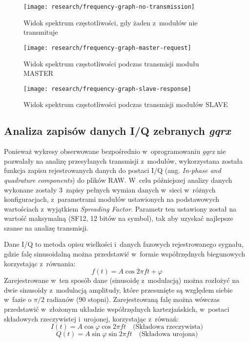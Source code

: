 \begin{figure}[!htbp]
    \centering
    \texttt{[image: research/frequency-graph-no-transmission]}
    \caption{\label{img:frequency-graph-no-transmission}Widok spektrum częstotliwości, gdy żaden z~modułów nie transmituje}
\end{figure}

\begin{figure}[!htbp]
    \centering
    \texttt{[image: research/frequency-graph-master-request]}
    \caption{\label{img:frequency-graph-master-request}Widok spektrum częstotliwości podczas transmisji modułu MASTER}
\end{figure}

\begin{figure}[!htbp]
    \centering
    \texttt{[image: research/frequency-graph-slave-response]}
    \caption{\label{img:frequency-graph-slave-response}Widok spektrum częstotliwości podczas transmisji modułów SLAVE}
\end{figure}

\FloatBarrier
\subsection{\label{sect:iq-data-gqrx}Analiza zapisów danych I/Q zebranych \textsl{gqrx}} Ponieważ wykresy obserwowane
bezpośrednio w~oprogramowaniu \textsl{gqrx} nie pozwalały na analizę przesyłanych transmisji z~modułów, wykorzystana
została funkcja zapisu rejestrowanych danych do postaci I/Q (ang. \textsl{In-phase and quadrature components}) do plików
RAW. W~celu późniejszej analizy danych wykonane zostały 3~zapisy pełnych wymian danych w~sieci w~różnych konfiguracjach,
z~parametrami modułów ustawionych na podstawowych wartościach z~wyjątkiem \textsl{Spreading Factor}. Parametr ten ustawiony
został na wartość maksymalną (SF12, 12 bitów na symbol), tak aby uzyskać najlepsze szanse na analizę transmisji.

Dane I/Q to metoda opisu wielkości i~danych fazowych rejestrowanego sygnału, gdzie falę sinusoidalną można przedstawić
w~formie współrzędnych biegunowych \cite{ni-iq-data} korzystając z~równania:
\begin{equation}
    f(t) = A\cos{2\pi{ft}+\varphi}
\end{equation}
Zarejestrowane w~ten sposób dane (sinusoidę z~modulacją) można rozłożyć na dwie sinusoidy z~modulacją amplitudy, które
przesunięte są względem siebie w~fazie o ${\pi}/2$ radianów (90 stopni). Zarejestrowaną falę można wówczas przedstawić
w~złożonym układzie współrzędnych kartezjańskich, w~postaci składowych rzeczywistej i~urojonej, korzystając z~równań:
\begin{equation}
    I(t) = A\cos{\varphi}\cos{2\pi{ft}} \quad\text{(Składowa rzeczywista)}
\end{equation}
\begin{equation}
    Q(t) = A\sin{\varphi}\sin{2\pi{ft}} \quad\text{(Składowa urojona)}
\end{equation}

